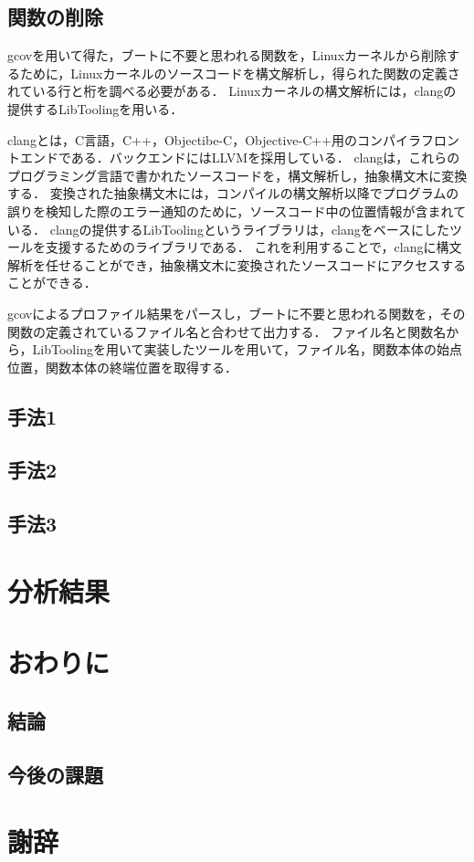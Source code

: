 \documentclass[graduation-thesis]{mlarticle}
\begin{document}
\subsection{関数の削除}
gcovを用いて得た，ブートに不要と思われる関数を，Linuxカーネルから削除するために，Linuxカーネルのソースコードを構文解析し，得られた関数の定義されている行と桁を調べる必要がある．
Linuxカーネルの構文解析には，clangの提供するLibToolingを用いる．

clangとは，C言語，C++，Objectibe-C，Objective-C++用のコンパイラフロントエンドである．バックエンドにはLLVMを採用している．
clangは，これらのプログラミング言語で書かれたソースコードを，構文解析し，抽象構文木に変換する．
変換された抽象構文木には，コンパイルの構文解析以降でプログラムの誤りを検知した際のエラー通知のために，ソースコード中の位置情報が含まれている．
clangの提供するLibToolingというライブラリは，clangをベースにしたツールを支援するためのライブラリである．
これを利用することで，clangに構文解析を任せることができ，抽象構文木に変換されたソースコードにアクセスすることができる．

gcovによるプロファイル結果をパースし，ブートに不要と思われる関数を，その関数の定義されているファイル名と合わせて出力する．
ファイル名と関数名から，LibToolingを用いて実装したツールを用いて，ファイル名，関数本体の始点位置，関数本体の終端位置を取得する．


\subsection{手法1}
\label{implementation:1}

\subsection{手法2}
\label{implementation:2}

\subsection{手法3}
\label{implementation:3}



\section{分析結果}
\label{result}



\section{おわりに}

\subsection{結論}
\subsection{今後の課題}

\clearpage
\section{謝辞}
\label{sec-8}
\clearpage



\end{document}

